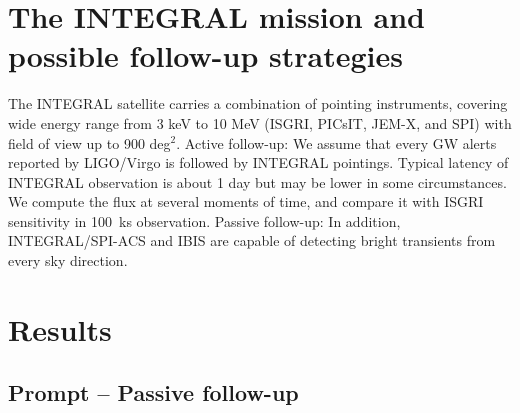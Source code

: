 \documentclass[11pt]{article}
\begin{document}
\section*{The INTEGRAL mission and possible follow-up strategies}


The INTEGRAL satellite carries a combination of pointing instruments, covering
wide energy range from 3 keV to 10 MeV (ISGRI, PICsIT, JEM-X, and SPI) with
field of view up to 900 deg$^2$. Active follow-up: We assume that every
GW alerts reported by LIGO/Virgo is followed by INTEGRAL pointings. Typical
latency of INTEGRAL observation is about 1 day but may be lower in some
circumstances. We compute the flux at several moments of time, and compare it
with ISGRI sensitivity in 100~ks observation. Passive follow-up: In
addition, INTEGRAL/SPI-ACS and IBIS are capable of detecting bright transients
from every sky direction.

\section*{Results}

\subsection*{Prompt -- Passive follow-up}
\end{document}

